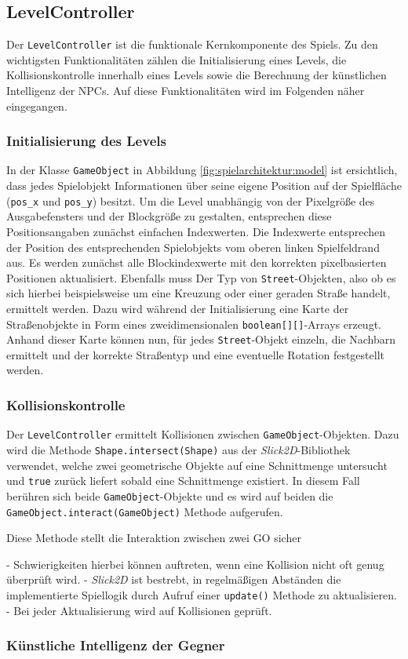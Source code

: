 \subsection{LevelController}

Der \texttt{LevelController} ist die funktionale Kernkomponente des Spiels.
Zu den wichtigsten Funktionalitäten zählen die Initialisierung eines Levels, die Kollisionskontrolle innerhalb eines Levels sowie die Berechnung der künstlichen Intelligenz der NPCs.
Auf diese Funktionalitäten wird im Folgenden näher eingegangen.

\subsubsection{Initialisierung des Levels}
In der Klasse \texttt{GameObject} in Abbildung \ref{fig:spielarchitektur:model} ist ersichtlich, dass jedes Spielobjekt Informationen über seine eigene Position auf der Spielfläche (\texttt{pos\_x} und \texttt{pos\_y}) besitzt.
Um die Level unabhängig von der Pixelgröße des Ausgabefensters und der Blockgröße zu gestalten, entsprechen diese Positionsangaben zunächst einfachen Indexwerten.
Die Indexwerte entsprechen der Position des entsprechenden Spielobjekts vom oberen linken Spielfeldrand aus.
Es werden zunächst alle Blockindexwerte mit den korrekten pixelbasierten Positionen aktualisiert.
Ebenfalls muss Der Typ von \texttt{Street}-Objekten, also ob es sich hierbei beispielsweise um eine Kreuzung oder einer geraden Straße handelt, ermittelt werden.
Dazu wird während der Initialisierung eine Karte der Straßenobjekte in Form eines zweidimensionalen \texttt{boolean[][]}-Arrays erzeugt.
Anhand dieser Karte können nun, für jedes \texttt{Street}-Objekt einzeln, die Nachbarn ermittelt und der korrekte Straßentyp und eine eventuelle Rotation festgestellt werden.

\subsubsection{Kollisionskontrolle}
Der \texttt{LevelController} ermittelt Kollisionen zwischen \texttt{GameObject}-Objekten.
Dazu wird die Methode \texttt{Shape.intersect(Shape)} aus der \textit{Slick2D}-Bibliothek verwendet, welche zwei geometrische Objekte auf eine Schnittmenge untersucht und \texttt{true} zurück liefert sobald eine Schnittmenge existiert.
In diesem Fall berühren sich beide \texttt{GameObject}-Objekte und es wird auf beiden die \texttt{GameObject.interact(GameObject)} Methode aufgerufen.

Diese Methode stellt die Interaktion zwischen zwei GO sicher 

- Schwierigkeiten hierbei können auftreten, wenn eine Kollision nicht oft genug überprüft wird.
- \textit{Slick2D} ist bestrebt, in regelmäßigen Abständen die implementierte Spiellogik durch Aufruf einer \texttt{update()} Methode zu aktualisieren.
- Bei jeder Aktualisierung wird auf Kollisionen geprüft. 



\subsubsection{Künstliche Intelligenz der Gegner}
